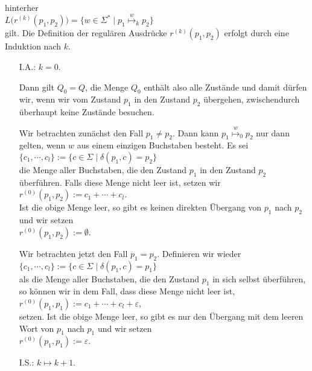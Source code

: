 hinterher
\\[0.2cm]
\hspace*{1.3cm}
$L\bigl(r^{(k)}(p_1, p_2)\bigr) = \bigl\{ w \in \Sigma^* \mid p_1 \stackrel{w}{\mapsto}_k p_2 \bigr\}$
\\[0.2cm]
gilt.
Die Definition der regul\"aren Ausdr\"ucke $r^{(k)}(p_1, p_2)$ erfolgt durch eine Induktion nach $k$.
\begin{enumerate}
\item[I.A.:] $k = 0$.  

  Dann gilt $Q_0 = Q$, die Menge $Q_0$ enth\"alt also alle Zust\"ande
  und damit d\"urfen wir, wenn wir vom Zustand $p_1$ in den Zustand $p_2$ \"ubergehen,
  zwischendurch \"uberhaupt keine Zust\"ande besuchen.

  Wir betrachten zun\"achst den Fall $p_1 \not= p_2$.  Dann kann $p_1 \stackrel{w}{\mapsto}_0 p_2$ nur dann gelten, wenn $w$ aus einem
  einzigen Buchstaben besteht.   Es sei
  \\[0.2cm]
  \hspace*{1.3cm}
  $\{ c_1, \cdots, c_l \} := \{ c \in \Sigma \mid \delta(p_1,c) = p_2 \}$
  \\[0.2cm]
  die Menge aller Buchstaben, die den Zustand $p_1$ in den Zustand $p_2$ \"uberf\"uhren.
  Falls diese Menge nicht leer ist, setzen wir 
  \\[0.2cm]
  \hspace*{1.3cm}
  $r^{(0)}(p_1, p_2) := c_1 + \cdots + c_l$. 
  \\[0.2cm]
  Ist die obige Menge leer, so gibt es keinen direkten \"Ubergang von
  $p_1$ nach $p_2$ und wir setzen 
  \\[0.2cm]
  \hspace*{1.3cm}
  $r^{(0)}(p_1, p_2) := \emptyset$.

  Wir betrachten jetzt den Fall $p_1 = p_2$.  Definieren wir wieder
  \\[0.2cm]
  \hspace*{1.3cm}
  $\{ c_1, \cdots, c_l \} := \{ c \in \Sigma \mid \delta(p_1,c) = p_1 \}$
  \\[0.2cm]
  als die Menge aller Buchstaben, die den Zustand $p_1$ in sich selbst \"uberf\"uhren,
  so k\"onnen wir in dem Fall, dass diese Menge nicht leer ist, 
  \\[0.2cm]
  \hspace*{1.3cm}
  $r^{(0)}(p_1, p_1) := c_1 + \cdots + c_l + \varepsilon$,
  \\[0.2cm]
  setzen.  Ist die obige Menge leer, so gibt es nur den \"Ubergang mit dem leeren Wort
  von $p_1$ nach $p_1$ und wir setzen 
  \\[0.2cm]
  \hspace*{1.3cm}
  $r^{(0)}(p_1, p_1) := \varepsilon$.
\item[I.S.:] $k \mapsto k+1$.  


\end{enumerate}
